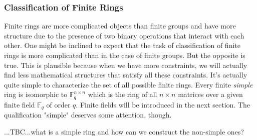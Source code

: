 

\subsubsection{Classification of Finite Rings}
Finite rings are more complicated objects than finite groups and have more structure due to the presence of two binary operations that interact with each other. One might be inclined to expect that the task of classification of finite rings is more complicated than in the case of finite groups. But the opposite is true. This is plausible because when we have more constraints, we will actually find less mathematical structures that satisfy all these constraints. It's actually quite simple to characterize the set of all possible finite rings. Every finite \emph{simple} ring is isomorphic to $\mathbb{F}_q^{n \times n}$ which is the ring of all $n \times n$ matrices over a given finite field $\mathbb{F}_q$ of order $q$. Finite fields will be introduced in the next section. The qualification "simple" deserves some attention, though.

...TBC...what is a simple ring and how can we construct the non-simple ones?



